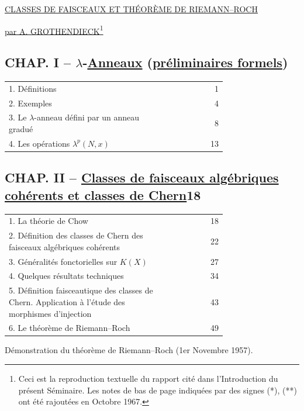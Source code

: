 \begin{center}
{\Large \underline{\underline{CLASSES DE FAISCEAUX ET THÉORÈME DE RIEMANN--ROCH}}}\par
\vspace{0.5em}
\underline{par A. GROTHENDIECK}\footnote{Ceci est la reproduction textuelle du rapport cité dans l'Introduction du présent Séminaire. Les notes de bas de page indiquées par des signes (*), (**) ont été rajoutées en Octobre 1967.}
\end{center}

\subsection*{CHAP. I -- $\lambda$-\uline{Anneaux} (\uline{préliminaires formels})}
\begin{longtable}{@{}p{0.74\linewidth}r@{}}
1. Définitions & 1\\
2. Exemples & 4\\
3. Le $\lambda$-anneau défini par un anneau gradué & 8\\
4. Les opérations $\lambda^p(N,x)$ & 13\\
\end{longtable}

\subsection*{CHAP. II -- \uline{Classes de faisceaux algébriques cohérents et classes de Chern}\hfill 18}
\begin{longtable}{@{}p{0.74\linewidth}r@{}}
1. La théorie de Chow & 18\\
2. Définition des classes de Chern des faisceaux algébriques cohérents & 22\\
3. Généralités fonctorielles sur $K(X)$ & 27\\
4. Quelques résultats techniques & 34\\
5. Définition faisceautique des classes de Chern. Application à l'étude des morphismes d'injection & 43\\
6. Le théorème de Riemann--Roch & 49
\end{longtable}

\begin{center}
Démonstration du théorème de Riemann--Roch (1er Novembre 1957).
\end{center}

\clearpage

